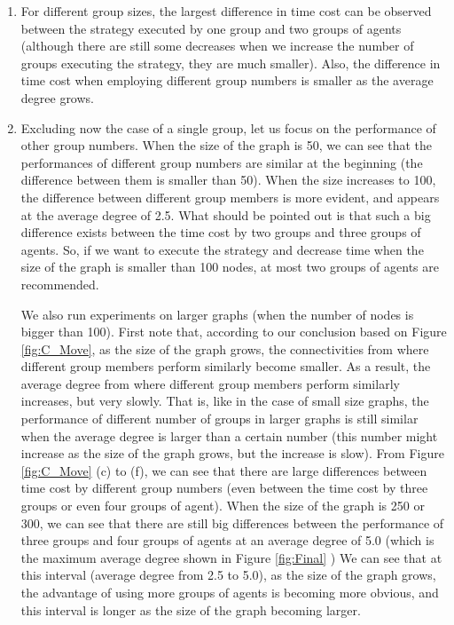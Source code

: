 \begin{enumerate}
\item For different group sizes, the largest difference in time cost can be observed between the strategy executed by one group and two groups of agents  (although there are still some decreases when we increase the number of groups executing the strategy, they are much smaller). Also, the difference in time cost when employing different group numbers is smaller as the average degree grows.

\item Excluding now the case of a single group, let us focus on the performance of other group numbers. When the size of the graph is 50, we can see that the performances of different group numbers are similar at the beginning (the difference between them is smaller than 50). When the size increases to 100, the difference   between different group members is more evident, and appears at the average degree of 2.5. What should be pointed out is that such a big difference exists between the time cost by two groups and three groups of agents. So, if we want to execute the strategy and decrease time when the size of the graph is smaller than 100 nodes, at most two groups of agents are recommended.

We also run experiments on larger  graphs  (when the number of nodes is bigger than 100). 
First note that, according to our conclusion based on Figure \ref{fig:C_Move}, as the size of the graph grows, the connectivities from where different group members perform similarly  become smaller. 
As a result, the average degree from where different group members perform similarly   increases, but very slowly. That is, like in the case of   small size graphs, the performance of different number of groups in larger graphs is still similar   when the average degree is larger than a certain number (this number might increase as the size of the graph grows,  but the increase is slow). From Figure \ref{fig:C_Move} (c) to (f), we can see that there are large differences between time cost by different group numbers (even between the time cost by three groups or even four groups of agent). When the size of the graph is 250 or 300, we can see that there are still  big differences between the performance of three groups and four groups of agents at an average degree of 5.0 (which is the maximum average degree shown in Figure \ref{fig:Final} )
We can see that at this interval (average degree from 2.5 to 5.0), as the size of the graph grows, the advantage of using more groups of agents is becoming more obvious, and this interval is longer as the size of the graph becoming larger.
 \end{enumerate}

